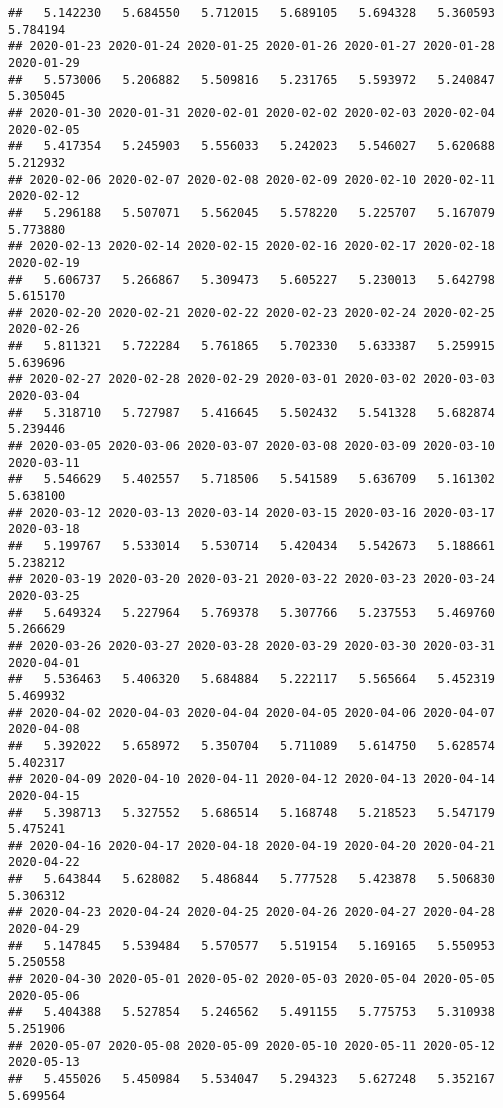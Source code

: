 \documentclass[
]{article}
\begin{document}
\begin{verbatim}
##   5.142230   5.684550   5.712015   5.689105   5.694328   5.360593   5.784194 
## 2020-01-23 2020-01-24 2020-01-25 2020-01-26 2020-01-27 2020-01-28 2020-01-29 
##   5.573006   5.206882   5.509816   5.231765   5.593972   5.240847   5.305045 
## 2020-01-30 2020-01-31 2020-02-01 2020-02-02 2020-02-03 2020-02-04 2020-02-05 
##   5.417354   5.245903   5.556033   5.242023   5.546027   5.620688   5.212932 
## 2020-02-06 2020-02-07 2020-02-08 2020-02-09 2020-02-10 2020-02-11 2020-02-12 
##   5.296188   5.507071   5.562045   5.578220   5.225707   5.167079   5.773880 
## 2020-02-13 2020-02-14 2020-02-15 2020-02-16 2020-02-17 2020-02-18 2020-02-19 
##   5.606737   5.266867   5.309473   5.605227   5.230013   5.642798   5.615170 
## 2020-02-20 2020-02-21 2020-02-22 2020-02-23 2020-02-24 2020-02-25 2020-02-26 
##   5.811321   5.722284   5.761865   5.702330   5.633387   5.259915   5.639696 
## 2020-02-27 2020-02-28 2020-02-29 2020-03-01 2020-03-02 2020-03-03 2020-03-04 
##   5.318710   5.727987   5.416645   5.502432   5.541328   5.682874   5.239446 
## 2020-03-05 2020-03-06 2020-03-07 2020-03-08 2020-03-09 2020-03-10 2020-03-11 
##   5.546629   5.402557   5.718506   5.541589   5.636709   5.161302   5.638100 
## 2020-03-12 2020-03-13 2020-03-14 2020-03-15 2020-03-16 2020-03-17 2020-03-18 
##   5.199767   5.533014   5.530714   5.420434   5.542673   5.188661   5.238212 
## 2020-03-19 2020-03-20 2020-03-21 2020-03-22 2020-03-23 2020-03-24 2020-03-25 
##   5.649324   5.227964   5.769378   5.307766   5.237553   5.469760   5.266629 
## 2020-03-26 2020-03-27 2020-03-28 2020-03-29 2020-03-30 2020-03-31 2020-04-01 
##   5.536463   5.406320   5.684884   5.222117   5.565664   5.452319   5.469932 
## 2020-04-02 2020-04-03 2020-04-04 2020-04-05 2020-04-06 2020-04-07 2020-04-08 
##   5.392022   5.658972   5.350704   5.711089   5.614750   5.628574   5.402317 
## 2020-04-09 2020-04-10 2020-04-11 2020-04-12 2020-04-13 2020-04-14 2020-04-15 
##   5.398713   5.327552   5.686514   5.168748   5.218523   5.547179   5.475241 
## 2020-04-16 2020-04-17 2020-04-18 2020-04-19 2020-04-20 2020-04-21 2020-04-22 
##   5.643844   5.628082   5.486844   5.777528   5.423878   5.506830   5.306312 
## 2020-04-23 2020-04-24 2020-04-25 2020-04-26 2020-04-27 2020-04-28 2020-04-29 
##   5.147845   5.539484   5.570577   5.519154   5.169165   5.550953   5.250558 
## 2020-04-30 2020-05-01 2020-05-02 2020-05-03 2020-05-04 2020-05-05 2020-05-06 
##   5.404388   5.527854   5.246562   5.491155   5.775753   5.310938   5.251906 
## 2020-05-07 2020-05-08 2020-05-09 2020-05-10 2020-05-11 2020-05-12 2020-05-13 
##   5.455026   5.450984   5.534047   5.294323   5.627248   5.352167   5.699564 

\end{verbatim}
\end{document}
